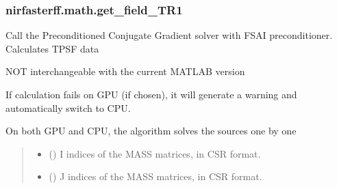 \documentclass[letterpaper,10pt,english]{sphinxmanual}
\begin{document}
\sphinxstepscope


\subsubsection{nirfasterff.math.get\_field\_TR1}
\label{\detokenize{_autosummary/nirfasterff.math.get_field_TR1:nirfasterff-math-get-field-tr1}}\label{\detokenize{_autosummary/nirfasterff.math.get_field_TR1::doc}}

\begin{fulllineitems}
\label{\detokenize{_autosummary/nirfasterff.math.get_field_TR1:nirfasterff.math.get_field_TR1}}
\pysigstartsignatures
\pysiglinewithargsret
{}
{\sphinxparamcomma {}\sphinxparamcomma {}\sphinxparamcomma {}\sphinxparamcomma {}\sphinxparamcomma {}\sphinxparamcomma {}\sphinxparamcomma {}}
{}
\pysigstopsignatures
\sphinxAtStartPar
Call the Preconditioned Conjugate Gradient solver with FSAI preconditioner. Calculates TPSF data

\sphinxAtStartPar
NOT interchangeable with the current MATLAB version

\sphinxAtStartPar
If calculation fails on GPU (if chosen), it will generate a warning and automatically switch to CPU.

\sphinxAtStartPar
On both GPU and CPU, the algorithm solves the sources one by one
\begin{quote}\begin{description}
\begin{itemize}
\item {} 
\sphinxAtStartPar
{} (\sphinxstyleliteralemphasis{\sphinxupquote{, }}) \textendash{} I indices of the MASS matrices, in CSR format.

\item {} 
\sphinxAtStartPar
{} (\sphinxstyleliteralemphasis{\sphinxupquote{, }}) \textendash{} J indices of the MASS matrices, in CSR format.


\end{itemize}
\end{description}
\end{quote}
\end{fulllineitems}
\end{document}
